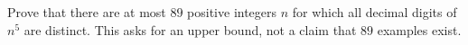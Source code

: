 Prove that there are at most $89$ positive integers $n$ for which all decimal digits of $n^5$ are distinct. This asks for an upper bound, not a claim that $89$ examples exist.
